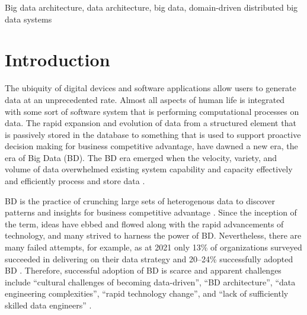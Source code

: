 \documentclass[conference]{IEEEtran}
\begin{document}
\begin{IEEEkeywords}
Big data architecture, data architecture, big data, domain-driven distributed big data systems
\end{IEEEkeywords}

\section{Introduction}
The ubiquity of digital devices and software applications allow users to generate data at an unprecedented rate. Almost all aspects of human life is integrated with some sort of software system that is performing computational processes on data. The rapid expansion and evolution of data from a structured
element that is passively stored in the database to something
that is used to support proactive decision making for business
competitive advantage, have dawned a new era, the era of
Big Data (BD). The BD era emerged when the velocity, variety, and volume of data overwhelmed existing system capability and capacity effectively and efficiently process and store data \cite{ataei2021neomycelia,AtaeiACIS}. 

BD is the practice of crunching large sets of heterogenous
data to discover patterns and insights for business competitive
advantage \cite{AtaeiHype}. Since the inception of the term, ideas have
ebbed and flowed along with the rapid advancements of
technology, and many strived to harness the power of BD. Nevertheless, there are many failed attempts, for example, as at 2021 only 13\%{} of organizations surveyed succeeded in delivering on their data strategy \cite{DataBricksSurvey} and 20--24\%{} successfully adopted BD \cite{NewVantageSurvey,GartnerSury}. Therefore, successful adoption of BD is scarce and apparent challenges include ``cultural challenges of becoming data-driven'', ``BD architecture'', ``data engineering complexities'', ``rapid technology change'', and ``lack of sufficiently skilled data engineers'' \cite{AtaeiBigDataEnvirons}.  

\end{document}
